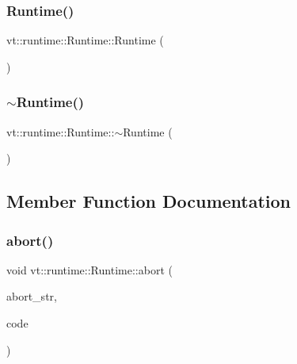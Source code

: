\mbox{\label{structvt_1_1runtime_1_1_runtime_a146708e42fa94f4d50bfdd6159f4d642}} 
\subsubsection{\texorpdfstring{Runtime()}{Runtime()}\hspace{0.1cm}{\footnotesize\ttfamily [3/3]}}
{\footnotesize\ttfamily vt\+::runtime\+::\+Runtime\+::\+Runtime (\begin{DoxyParamCaption}\item[{\hyperlink{structvt_1_1runtime_1_1_runtime}{Runtime} \&\&}]{ }\end{DoxyParamCaption})\hspace{0.3cm}{\ttfamily [delete]}}

\mbox{\label{structvt_1_1runtime_1_1_runtime_ae164ab301b823d985a62b7a5fb62cf07}} 
\subsubsection{\texorpdfstring{$\sim$\+Runtime()}{~Runtime()}}
{\footnotesize\ttfamily vt\+::runtime\+::\+Runtime\+::$\sim$\+Runtime (\begin{DoxyParamCaption}{ }\end{DoxyParamCaption})\hspace{0.3cm}{\ttfamily [virtual]}}



\subsection{Member Function Documentation}
\mbox{\label{structvt_1_1runtime_1_1_runtime_a6780309c9de951abbf73780860bff5af}} 
\subsubsection{\texorpdfstring{abort()}{abort()}}
{\footnotesize\ttfamily void vt\+::runtime\+::\+Runtime\+::abort (\begin{DoxyParamCaption}\item[{std\+::string const}]{abort\+\_\+str,  }\item[{\hyperlink{namespacevt_a793764d753923abc3d32929870beb485}{Error\+Code\+Type} const}]{code }\end{DoxyParamCaption})}



